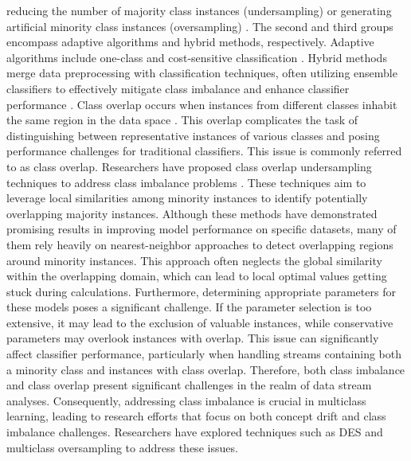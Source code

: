   reducing the number of majority class instances (undersampling) or generating artificial minority class instances (oversampling)
  \cite{liu2018making,lopez2012analysis}. The second and third groups encompass adaptive algorithms and hybrid methods, respectively. Adaptive algorithms include
  one-class and cost-sensitive classification \cite{zhang2020towards}. Hybrid methods merge data preprocessing with classification techniques, often utilizing ensemble classifiers to effectively mitigate class imbalance and enhance classifier performance \cite{chawla2003smoteboost, wang2010negative, bhowan2012evolving}.
  Class overlap occurs when instances from different classes inhabit the same region in the data space \cite{galar2011review, cruz2018dynamic}. This overlap complicates the task of distinguishing between representative instances of various classes and posing performance challenges for traditional classifiers. This issue is commonly referred to as class overlap. Researchers have proposed class overlap undersampling
  techniques to address class imbalance problems \cite{kuncheva2000clustering}. These techniques aim to leverage local similarities among minority instances to
  identify potentially overlapping majority instances. Although these methods have demonstrated promising results in improving model
  performance on specific datasets, many of them rely heavily on nearest-neighbor approaches to detect overlapping regions around
  minority instances. This approach often neglects the global similarity within the overlapping domain, which can lead to local optimal
  values getting stuck during calculations. Furthermore, determining appropriate parameters for these models poses a significant
  challenge. If the parameter selection is too extensive, it may lead to the exclusion of valuable instances, while conservative parameters
  may overlook instances with overlap. This issue can significantly affect classifier performance, particularly when handling streams
  containing both a minority class and instances with class overlap. Therefore, both class imbalance and class overlap present significant
  challenges in the realm of data stream analyses. Consequently, addressing class imbalance is crucial in multiclass learning, leading to
  research efforts that focus on both concept drift and class imbalance challenges. Researchers have explored techniques such as DES and
  multiclass oversampling to address these issues.
